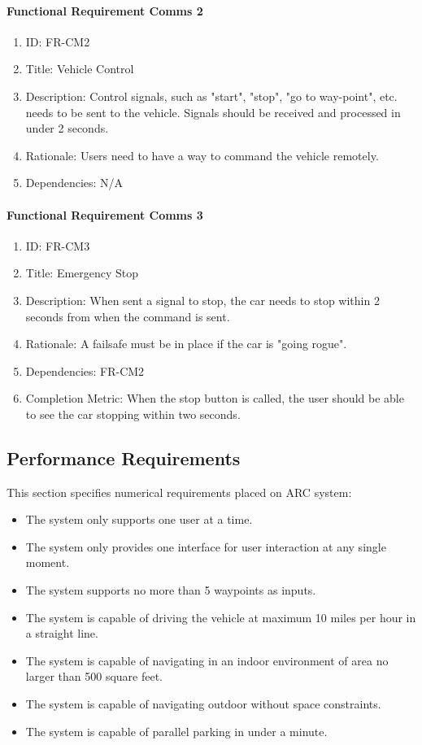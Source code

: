 \documentclass[compsoc,draftclsnofoot,onecolumn,10pt]{IEEEtran}
\begin{document}
	\paragraph{Functional Requirement Comms 2}
		\begin{enumerate}
			\item ID: FR-CM2
			\item Title: Vehicle Control
			\item Description: Control signals, such as "start", "stop", "go to way-point", etc. needs to be sent to the vehicle. Signals should be received and processed in under 2 seconds.
			\item Rationale: Users need to have a way to command the vehicle remotely.
			\item Dependencies: N/A
		\end{enumerate}
		
        \paragraph{Functional Requirement Comms 3}
        		\begin{enumerate}
        			\item ID: FR-CM3
        			\item Title: Emergency Stop
        			\item Description: When sent a signal to stop, the car needs to stop within 2 seconds from when the command is sent.
        			\item Rationale: A failsafe must be in place if the car is "going rogue".
        			\item Dependencies: FR-CM2
			\item Completion Metric: When the stop button is called, the user should be able to see the car stopping within two seconds.
        		\end{enumerate}

\subsection{Performance Requirements}
This section specifies numerical requirements placed on ARC system:
\begin{itemize}
	\item The system only supports one user at a time.
	\item The system only provides one interface for user interaction at any single moment.
	\item The system supports no more than 5 waypoints as inputs.
	\item The system is capable of driving the vehicle at maximum 10 miles per hour in a straight line.
	\item The system is capable of navigating in an indoor environment of area no larger than 500 square feet.
	\item The system is capable of navigating outdoor without space constraints.
	\item The system is capable of parallel parking in under a minute. 
\end{itemize}
\end{document}
